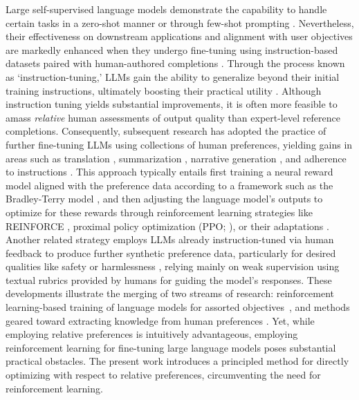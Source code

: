 Large self-supervised language models demonstrate the capability to handle certain tasks in a zero-shot manner \citep{radford2019language} or through few-shot prompting \citep{gpt3,megatron,chowdhery2022palm}. Nevertheless, their effectiveness on downstream applications and alignment with user objectives are markedly enhanced when they undergo fine-tuning using instruction-based datasets paired with human-authored completions \citep{mishra-etal-2022-cross,sanh2022multitask,chung2022scaling,thoppilan2022lamda}. Through the process known as `instruction-tuning,' LLMs gain the ability to generalize beyond their initial training instructions, ultimately boosting their practical utility \citep{chung2022scaling}. Although instruction tuning yields substantial improvements, it is often more feasible to amass \textit{relative} human assessments of output quality than expert-level reference completions. Consequently, subsequent research has adopted the practice of further fine-tuning LLMs using collections of human preferences, yielding gains in areas such as translation \citep{kreutzer-etal-2018-reliability}, summarization \citep{stiennon2022learning,ziegler2020finetuning}, narrative generation \citep{ziegler2020finetuning}, and adherence to instructions \citep{ouyang2022training,ramamurthy2023is}. This approach typically entails first training a neural reward model aligned with the preference data according to a framework such as the Bradley-Terry model \citep{bradley1952rankanalysis}, and then adjusting the language model's outputs to optimize for these rewards through reinforcement learning strategies like REINFORCE \citep{williams1992reinforce}, proximal policy optimization (PPO; \cite{schulman2017proximal}), or their adaptations \citep{ramamurthy2023is}. Another related strategy employs LLMs already instruction-tuned via human feedback to produce further synthetic preference data, particularly for desired qualities like safety or harmlessness \citep{bai2022constitutional}, relying mainly on weak supervision using textual rubrics provided by humans for guiding the model's responses. These developments illustrate the merging of two streams of research: reinforcement learning-based training of language models for assorted objectives~\citep{Ranzato2015SequenceLT,paulus2018a,wu2018learning}, and methods geared toward extracting knowledge from human preferences \citep{christiano2017deep,kupcsik2018learning}. Yet, while employing relative preferences is intuitively advantageous, employing reinforcement learning for fine-tuning large language models poses substantial practical obstacles. The present work introduces a principled method for directly optimizing with respect to relative preferences, circumventing the need for reinforcement learning.

